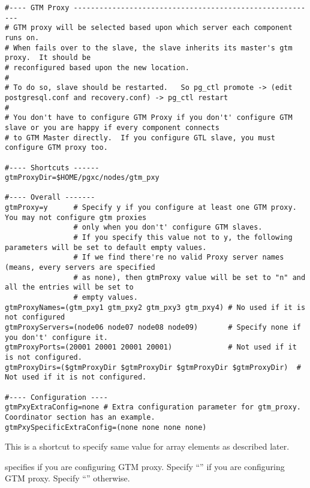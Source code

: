   
  \begin{lstlisting}[frame=single, basicstyle=\ttfamily\tiny]
#---- GTM Proxy ---------------------------------------------------------
# GTM proxy will be selected based upon which server each component runs on.
# When fails over to the slave, the slave inherits its master's gtm proxy.  It should be
# reconfigured based upon the new location.
#
# To do so, slave should be restarted.   So pg_ctl promote -> (edit postgresql.conf and recovery.conf) -> pg_ctl restart
#
# You don't have to configure GTM Proxy if you don't' configure GTM slave or you are happy if every component connects
# to GTM Master directly.  If you configure GTL slave, you must configure GTM proxy too.

#---- Shortcuts ------
gtmProxyDir=$HOME/pgxc/nodes/gtm_pxy

#---- Overall -------
gtmProxy=y      # Specify y if you configure at least one GTM proxy.   You may not configure gtm proxies
                # only when you don't' configure GTM slaves.
                # If you specify this value not to y, the following parameters will be set to default empty values.
                # If we find there're no valid Proxy server names (means, every servers are specified
                # as none), then gtmProxy value will be set to "n" and all the entries will be set to
                # empty values.
gtmProxyNames=(gtm_pxy1 gtm_pxy2 gtm_pxy3 gtm_pxy4) # No used if it is not configured
gtmProxyServers=(node06 node07 node08 node09)       # Specify none if you don't' configure it.
gtmProxyPorts=(20001 20001 20001 20001)             # Not used if it is not configured.
gtmProxyDirs=($gtmProxyDir $gtmProxyDir $gtmProxyDir $gtmProxyDir)  # Not used if it is not configured.

#---- Configuration ----
gtmPxyExtraConfig=none # Extra configuration parameter for gtm_proxy.  Coordinator section has an example.
gtmPxySpecificExtraConfig=(none none none none)
  \end{lstlisting}
  
  
      This is a shortcut to specify same value for  array elements as
	  described later.
  
  
       specifies if you are configuring GTM proxy.
      Specify ``'' if you are configuring GTM proxy.
      Specify ``'' otherwise.
  
